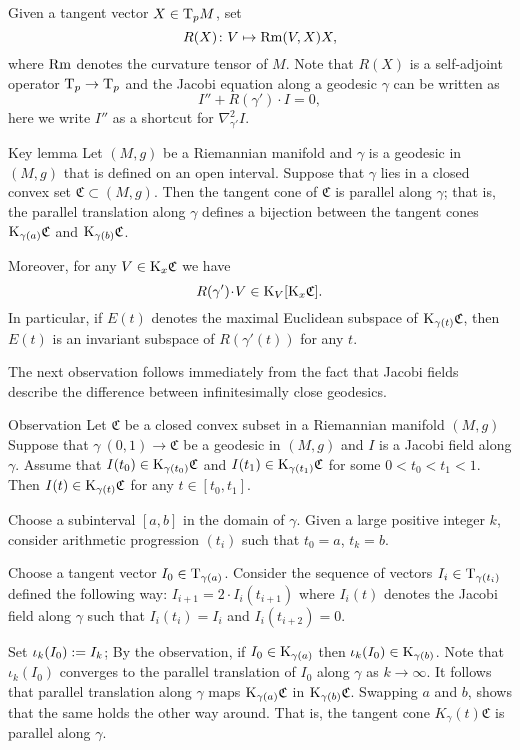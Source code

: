 \documentclass[a4paper,10pt]{article}
\begin{document}
Given a tangent vector $X\in\mathrm{T}_pM$, set
\[R(X)\colon V\mapsto \operatorname{Rm}(V,X)X,\]
where $\operatorname{Rm}$ denotes the curvature tensor of $M$.
Note that $R(X)$ is a self-adjoint operator $\mathrm{T}_p\to \mathrm{T}_p$ and the Jacobi equation along a geodesic $\gamma$ can be written as 
\[I''+R(\gamma')\cdot I=0,\]
here we write $I''$ as a shortcut for $\nabla^2_{\gamma'}I$.
 
\begin{thm}{Key lemma}\label{lem:key}
Let $(M,g)$ be a Riemannian manifold and $\gamma$ is a geodesic in $(M,g)$ that is defined on an open interval.
Suppose that $\gamma$ lies in a closed convex set $\mathfrak{C}\subset (M,g)$.
Then the tangent cone of $\mathfrak{C}$ is parallel along $\gamma$; that is, the parallel translation along $\gamma$ defines a bijection between the tangent cones $\mathrm{K}_{\gamma(a)}\mathfrak{C}$ and $\mathrm{K}_{\gamma(b)}\mathfrak{C}$.

Moreover, for any $V\in \mathrm{K}_x\mathfrak{C}$ we have
\[R(\gamma')\cdot V\in \K_V[\K_x\mathfrak{C}].\]
In particular, if $E(t)$ denotes the maximal Euclidean subspace of $\mathrm{K}_{\gamma(t)}\mathfrak{C}$, then $E(t)$ is an invariant subspace of $R(\gamma'(t))$ for any $t$.
\end{thm}

The next observation follows immediately from the fact that Jacobi fields describe the difference between infinitesimally close geodesics.

\begin{thm}{Observation}
Let  $\mathfrak{C}$ be a closed convex subset in a Riemannian manifold $(M,g)$
Suppose that $\gamma\:(0,1)\to\mathfrak{C}$ be a geodesic in $(M,g)$ and $I$ is a Jacobi field along $\gamma$.
Assume that $I(t_0)\in \mathrm{K}_{\gamma(t_0)}\mathfrak{C}$ and $I(t_1)\in \mathrm{K}_{\gamma(t_1)}\mathfrak{C}$ for some $0<t_0<t_1<1$.
Then $I(t)\in \mathrm{K}_{\gamma(t)}\mathfrak{C}$ for any $t\in [t_0,t_1]$.
\end{thm}

Choose a subinterval $[a,b]$ in the domain of $\gamma$.
Given a large positive integer $k$, consider arithmetic progression
$(t_i)$ such that $t_0=a$, $t_k=b$.

Choose a tangent vector $I_0\in\mathrm{T}_{\gamma(a)}$. 
Consider the sequence of vectors $I_i\z\in\T_{\gamma(t_i)}$ defined the following way: $I_{i+1}=2\cdot I_i(t_{i+1})$ where $I_i(t)$ denotes the Jacobi field along $\gamma$ such that $I_i(t_i)=I_i$ and $I_i(t_{i+2})=0$.

Set $\iota_k(I_0)\mathrel{{:}{=}} I_k$;
By the observation, if $I_0\in \mathrm{K}_{\gamma(a)}$ then $\iota_k(I_0)\in \mathrm{K}_{\gamma(b)}$.
Note that $\iota_k(I_0)$ converges to the parallel translation of $I_0$ along $\gamma$ as $k\to \infty$.
It follows that parallel translation along $\gamma$ maps $\mathrm{K}_{\gamma(a)}\mathfrak{C}$ in $\mathrm{K}_{\gamma(b)}\mathfrak{C}$.
Swapping $a$ and $b$, shows that the same holds the other way around.
That is, the tangent cone $K_\gamma(t)\mathfrak{C}$ is parallel along $\gamma$.
\end{document}
